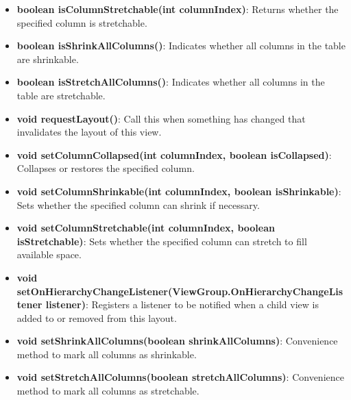 \documentclass{report}
\begin{document}
\begin{itemize}
\begin{itemize}
                \item \textbf{boolean isColumnStretchable(int columnIndex)}: Returns whether the specified column is stretchable.
                \item \textbf{boolean isShrinkAllColumns()}: Indicates whether all columns in the table are shrinkable.
                \item \textbf{boolean isStretchAllColumns()}: Indicates whether all columns in the table are stretchable.
                \item \textbf{void requestLayout()}: Call this when something has changed that invalidates the layout of this view.
                \item \textbf{void setColumnCollapsed(int columnIndex, boolean isCollapsed)}: Collapses or restores the specified column.
                \item \textbf{void setColumnShrinkable(int columnIndex, boolean isShrinkable)}: Sets whether the specified column can shrink if necessary.
                \item \textbf{void setColumnStretchable(int columnIndex, boolean isStretchable)}: Sets whether the specified column can stretch to fill available space.
                \item \textbf{void setOnHierarchyChangeListener(ViewGroup.OnHierarchyChangeListener listener)}: Registers a listener to be notified when a child view is added to or removed from this layout.
                \item \textbf{void setShrinkAllColumns(boolean shrinkAllColumns)}: Convenience method to mark all columns as shrinkable.
                \item \textbf{void setStretchAllColumns(boolean stretchAllColumns)}: Convenience method to mark all columns as stretchable.
            \end{itemize}


\end{itemize}
\end{document}
